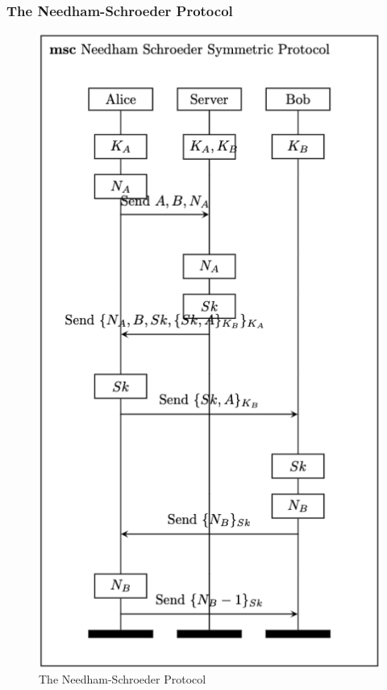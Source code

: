 \documentclass[aspectratio=169,t,xcolor=table]{beamer}
\begin{document}
\begin{frame}
    \frametitle{The Needham-Schroeder Protocol}
    \begin{figure}
        \centering
        \includegraphics[width=.26\textwidth]{images/NS.png}
        \caption{The Needham-Schroeder Protocol}
    \end{figure}
\end{frame}
\end{document}
